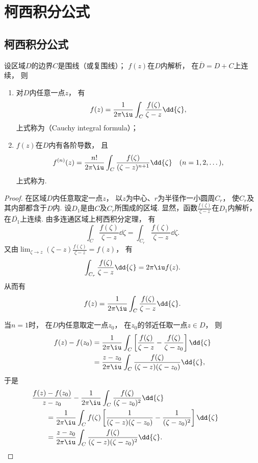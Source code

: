 \section{柯西积分公式}
\subsection{柯西积分公式}
\begin{theorem}\label{theorem:解析函数的积分表示.柯西积分公式}
设区域\(D\)的边界\(C\)是围线（或复围线）；
\(f(z)\)在\(D\)内解析，
在\(\overline{D}=D+C\)上连续，
则\begin{enumerate}
	\item 对\(D\)内任意一点\(z\)，
	有\begin{equation}\label{equation:解析函数的积分表示.柯西积分公式}
		f(z)
		= \frac{1}{2\pi\iu}
		\int_C \frac{f(\zeta)}{\zeta-z} \dd{\zeta},
	\end{equation}
	上式称为（Cauchy integral formula）；

	\item \(f(z)\)在\(D\)内有各阶导数，
	且\begin{equation}\label{equation:解析函数的积分表示.柯西高阶导数公式}
		f^{(n)}(z)
		= \frac{n!}{2\pi\iu}
		\int_C \frac{f(\zeta)}{(\zeta-z)^{n+1}} \dd{\zeta}
		\quad (n=1,2,\dots),
	\end{equation}
	上式称为.
\end{enumerate}
\begin{proof}
在区域\(D\)内任意取定一点\(z\)，
以\(z\)为中心、\(r\)为半径作一小圆周\(C_r\)，
使\(C_r\)及其内部都含于\(D\)内.
设\(D_1\)是由\(C\)及\(C_r\)所围成的区域.
显然，函数\(\frac{f(\zeta)}{\zeta-z}\)在\(D_1\)内解析，
在\(\overline{D_1}\)上连续.
由多连通区域上柯西积分定理，
有\[
	\int_C \frac{f(\zeta)}{\zeta-z} \dd{\zeta}
	= \int_{C_r} \frac{f(\zeta)}{\zeta-z} \dd{\zeta}.
\]
又由\(\lim_{\zeta \to z} (\zeta-z) \frac{f(\zeta)}{\zeta-z} = f(z)\)，
有\[
	\int_{C_r} \frac{f(\zeta)}{\zeta-z} \dd{\zeta} = 2\pi\iu f(z).
\]
从而有\[
	f(z) = \frac{1}{2\pi\iu} \int_C \frac{f(\zeta)}{\zeta-z} \dd{\zeta}.
\]

当\(n=1\)时，
在\(D\)内任意取定一点\(z_0\)，
在\(z_0\)的邻近任取一点\(z \in D\)，
则\begin{align*}
	f(z)-f(z_0)
	&= \frac{1}{2\pi\iu}
		\int_C \left[
			\frac{f(\zeta)}{\zeta-z}
			- \frac{f(\zeta)}{\zeta-z_0}
		\right] \dd{\zeta} \\
	&= \frac{z-z_0}{2\pi\iu}
		\int_C \frac{f(\zeta)}{(\zeta-z)(\zeta-z_0)} \dd{\zeta},
\end{align*}
于是\begin{align*}
	&\hspace{-20pt}
		\frac{f(z)-f(z_0)}{z-z_0}
		- \frac{1}{2\pi\iu}
		\int_C \frac{f(\zeta)}{(\zeta-z_0)^2} \dd{\zeta} \\
	&=\frac{1}{2\pi\iu}
		\int_C f(\zeta)
		\left[
			\frac{1}{(\zeta-z)(\zeta-z_0)}-\frac{1}{(\zeta-z_0)^2}
		\right] \dd{\zeta} \\
	&=\frac{z-z_0}{2\pi\iu}
		\int_C \frac{f(\zeta)}{(\zeta-z)(\zeta-z_0)^2} \dd{\zeta}.
\end{align*}


\end{proof}
\end{theorem}
